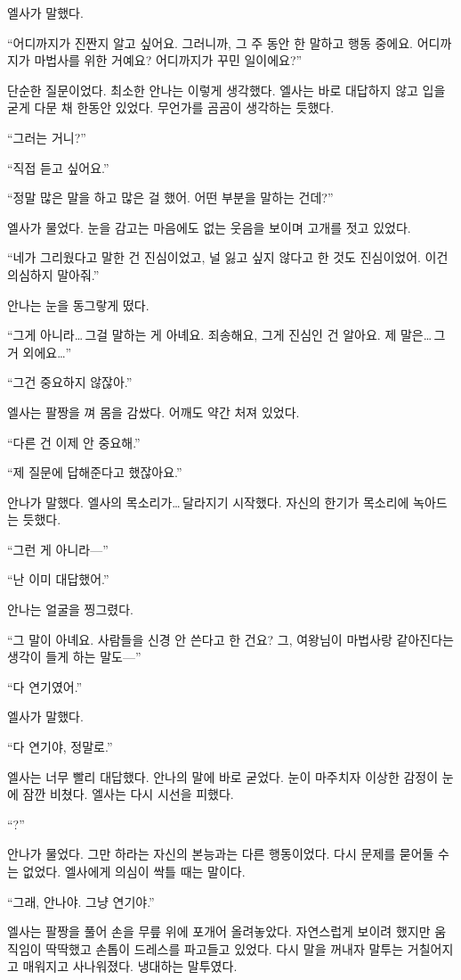 엘사가 말했다.

``어디까지가 진짠지 알고 싶어요. 그러니까, 그 주 동안 한 말하고 행동 중에요. 어디까지가 마법사를 위한 거예요? 어디까지가 꾸민 일이에요?''

단순한 질문이었다. 최소한 안나는 이렇게 생각했다. 엘사는 바로 대답하지 않고 입을 굳게 다문 채 한동안 있었다. 무언가를 곰곰이 생각하는 듯했다.

`` 그러는 거니?''

``직접 듣고 싶어요.''

``정말 많은 말을 하고 많은 걸 했어. 어떤 부분을 말하는 건데?''

엘사가 물었다. 눈을 감고는 마음에도 없는 웃음을 보이며 고개를 젓고 있었다.

``네가 그리웠다고 말한 건 진심이었고, 널 잃고 싶지 않다고 한 것도 진심이었어. 이건 의심하지 말아줘.''

안나는 눈을 동그랗게 떴다.

``그게 아니라\ldots\,그걸 말하는 게 아녜요. 죄송해요, 그게 진심인 건 알아요. 제 말은\ldots\,그거 외에요\ldots''

``그건 중요하지 않잖아.''

엘사는 팔짱을 껴 몸을 감쌌다. 어깨도 약간 처져 있었다.

``다른 건 이제 안 중요해.''

``제 질문에 답해준다고 했잖아요.''

안나가 말했다. 엘사의 목소리가\ldots\,달라지기 시작했다. 자신의 한기가 목소리에 녹아드는 듯했다.

``그런 게 아니라—''

``난 이미 대답했어.''

안나는 얼굴을 찡그렸다.

``그 말이 아녜요. 사람들을 신경 안 쓴다고 한 건요? 그, 여왕님이 마법사랑 같아진다는 생각이 들게 하는 말도—''

``다 연기였어.''

엘사가 말했다.

``다 연기야, 정말로.''

엘사는 너무 빨리 대답했다. 안나의 말에 바로 굳었다. 눈이 마주치자 이상한 감정이 눈에 잠깐 비쳤다. 엘사는 다시 시선을 피했다.

``?''

안나가 물었다. 그만 하라는 자신의 본능과는 다른 행동이었다. 다시 문제를 묻어둘 수는 없었다. 엘사에게 의심이 싹틀 때는 말이다.

``그래, 안나야. 그냥 연기야.''

엘사는 팔짱을 풀어 손을 무릎 위에 포개어 올려놓았다. 자연스럽게 보이려 했지만 움직임이 딱딱했고 손톱이 드레스를 파고들고 있었다. 다시 말을 꺼내자 말투는 거칠어지고 매워지고 사나워졌다. 냉대하는 말투였다.

